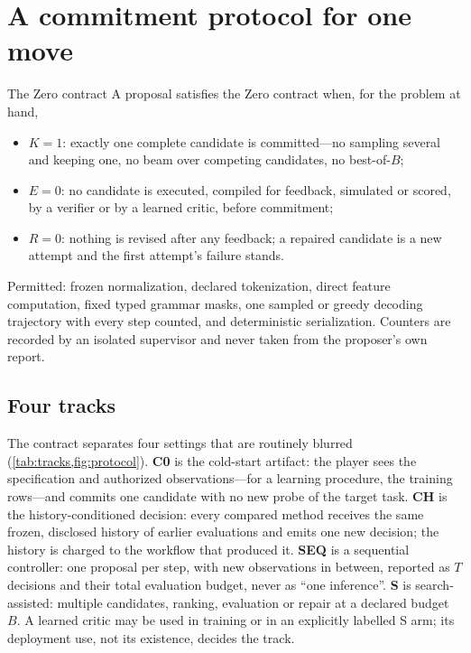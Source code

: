\section{A commitment protocol for one move}
\label{sec:protocol}

\begin{definition}{The Zero contract}
\label{def:zero}
A proposal satisfies the Zero contract when, for the problem at hand,
\begin{itemize}
\item $K=1$: exactly one complete candidate is committed---no sampling several and keeping one, no
beam over competing candidates, no best-of-$B$;
\item $E=0$: no candidate is executed, compiled for feedback, simulated or scored, by a verifier or by
a learned critic, before commitment;
\item $R=0$: nothing is revised after any feedback; a repaired candidate is a new attempt and the
first attempt's failure stands.
\end{itemize}
Permitted: frozen normalization, declared tokenization, direct feature computation, fixed typed
grammar masks, one sampled or greedy decoding trajectory with every step counted, and deterministic
serialization. Counters are recorded by an isolated supervisor and never taken from the proposer's
own report.
\end{definition}

\subsection{Four tracks}

The contract separates four settings that are routinely blurred (\cref{tab:tracks,fig:protocol}).
\textbf{C0} is the cold-start artifact: the player sees the specification and authorized
observations---for a learning procedure, the training rows---and commits one candidate with no new
probe of the target task. \textbf{CH} is the history-conditioned decision: every compared method
receives the same frozen, disclosed history of earlier evaluations and emits one new decision; the
history is charged to the workflow that produced it. \textbf{SEQ} is a sequential controller: one
proposal per step, with new observations in between, reported as $T$ decisions and their total
evaluation budget, never as ``one inference''. \textbf{S} is search-assisted: multiple candidates,
ranking, evaluation or repair at a declared budget $B$. A learned critic may be used in training or in
an explicitly labelled S arm; its deployment use, not its existence, decides the track.


